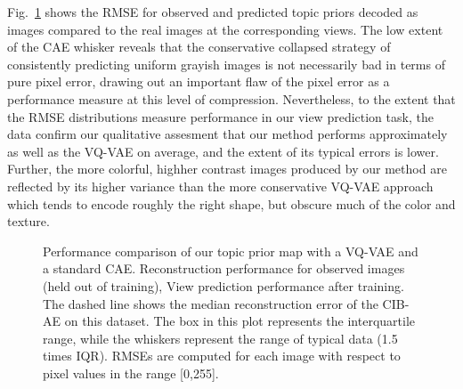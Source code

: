 Fig.~\ref{fig:vs_vqvae} shows the RMSE for observed and predicted topic priors decoded as images compared to the real images at the corresponding views. The low extent of the CAE whisker reveals that the conservative collapsed strategy of consistently predicting uniform grayish images is not necessarily bad in terms of pure pixel error, drawing out an important flaw of the pixel error as a performance measure at this level of compression. Nevertheless, to the extent that the RMSE distributions measure performance in our view prediction task, the data confirm our qualitative assesment that our method performs approximately as well as the VQ-VAE on average, and the extent of its typical errors is lower. Further, the more colorful, highher contrast images produced by our method are reflected by its higher variance than the more conservative VQ-VAE approach which tends to encode roughly the right shape, but obscure much of the color and texture.

\begin{figure}
    \begin{center}
    \end{center}
    \caption{ Performance comparison of our topic prior map with a VQ-VAE and a standard CAE.
    \protect{} Reconstruction performance for observed images (held out of training),
    \protect{} View prediction performance after training. The dashed line shows the median reconstruction error of the CIB-AE on this dataset. The box in this plot represents the interquartile range, while the whiskers represent the range of typical data (1.5 times IQR). RMSEs are computed for each image with respect to pixel values in the range [0,255].
    }
    \label{fig:vs_vqvae}
\end{figure}

